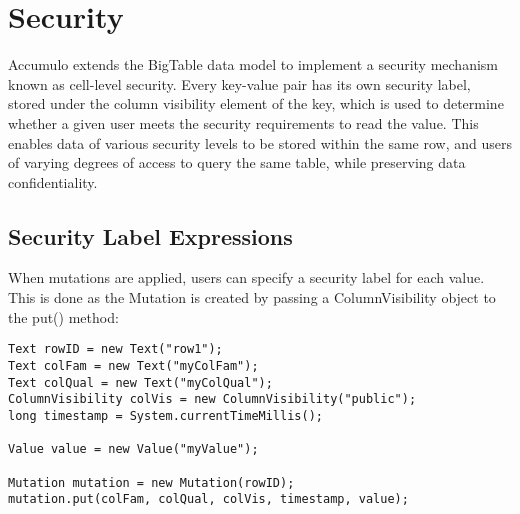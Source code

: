 
%
%

\chapter{Security}

Accumulo extends the BigTable data model to implement a security mechanism
known as cell-level security. Every key-value pair has its own security label, stored
under the column visibility element of the key, which is used to determine whether
a given user meets the security requirements to read the value. This enables data of
various security levels to be stored within the same row, and users of varying
degrees of access to query the same table, while preserving data confidentiality.

\section{Security Label Expressions}

When mutations are applied, users can specify a security label for each value. This is
done as the Mutation is created by passing a ColumnVisibility object to the put()
method:

\begingroup\fontsize{8pt}{8pt}\selectfont\begin{verbatim}
Text rowID = new Text("row1");
Text colFam = new Text("myColFam");
Text colQual = new Text("myColQual");
ColumnVisibility colVis = new ColumnVisibility("public");
long timestamp = System.currentTimeMillis();

Value value = new Value("myValue");

Mutation mutation = new Mutation(rowID);
mutation.put(colFam, colQual, colVis, timestamp, value);
\end{verbatim}\endgroup

